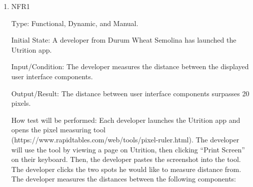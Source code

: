 \documentclass[12pt, titlepage]{article}
\begin{document}
\begin{enumerate}
\item{NFR1\\} 

Type: Functional, Dynamic, and Manual.

Initial State: A developer from Durum Wheat Semolina has launched the Utrition app.

Input/Condition: The developer measures the distance between the displayed user interface components.

Output/Result: The distance between user interface components surpasses 20 pixels.

How test will be performed: Each developer launches the Utrition app and opens the pixel measuring tool (https://www.rapidtables.com/web/tools/pixel-ruler.html). The developer will use the tool by viewing a page on Utrition, then clicking “Print Screen'' on their keyboard. Then, the developer pastes the screenshot into the tool. The developer clicks the two spots he would like to measure distance from. The developer measures the distances between the following components:	


\end{enumerate}
\end{document}

